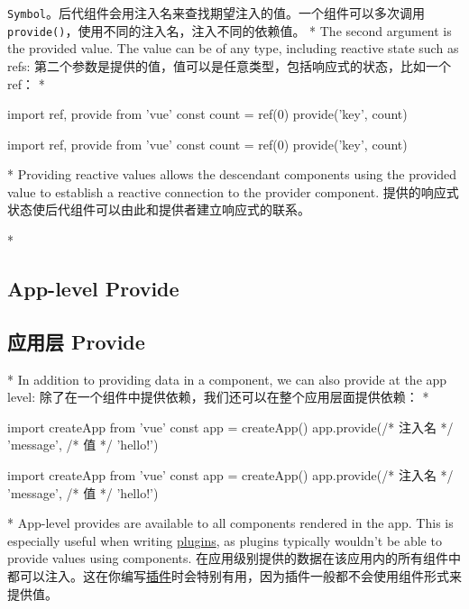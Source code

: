 \begin{paracol}{2}
\texttt{Symbol}。后代组件会用注入名来查找期望注入的值。一个组件可以多次调用
\texttt{provide()}，使用不同的注入名，注入不同的依赖值。
\switchcolumn[0]*%
The second argument is the provided value. The value can be of any type,
including reactive state such as refs:
\switchcolumn
第二个参数是提供的值，值可以是任意类型，包括响应式的状态，比如一个 ref：
\switchcolumn[0]*%
\begin{codeJs}
import { ref, provide } from 'vue'
const count = ref(0)
provide('key', count)
\end{codeJs}
\switchcolumn
\begin{codeJs}
import { ref, provide } from 'vue'
const count = ref(0)
provide('key', count)
\end{codeJs}
\switchcolumn[0]*%
Providing reactive values allows the descendant components using the
provided value to establish a reactive connection to the provider
component.
\switchcolumn
提供的响应式状态使后代组件可以由此和提供者建立响应式的联系。
\end{paracol}

\begin{paracol}{2} 
\switchcolumn[0]*%
\subsection{App-level Provide}
\switchcolumn
\subsection{应用层 Provide}
\switchcolumn[0]*%
In addition to providing data in a component, we can also provide at the
app level:
\switchcolumn
除了在一个组件中提供依赖，我们还可以在整个应用层面提供依赖：
\switchcolumn[0]*%
\begin{codeJs}
import { createApp } from 'vue'
const app = createApp({})
app.provide(/* 注入名 */ 'message', /* 值 */ 'hello!')
\end{codeJs}
\switchcolumn
\begin{codeJs}
import { createApp } from 'vue'
const app = createApp({})
app.provide(/* 注入名 */ 'message', /* 值 */ 'hello!')
\end{codeJs}
\switchcolumn[0]*%
App-level provides are available to all components rendered in the app.
This is especially useful when writing
\href{https://vuejs.org/guide/reusability/plugins.html}{plugins}, as
plugins typically wouldn't be able to provide values using components.
\switchcolumn
在应用级别提供的数据在该应用内的所有组件中都可以注入。这在你编写\href{https://cn.vuejs.org/guide/reusability/plugins.html}{插件}时会特别有用，因为插件一般都不会使用组件形式来提供值。
\end{paracol}

